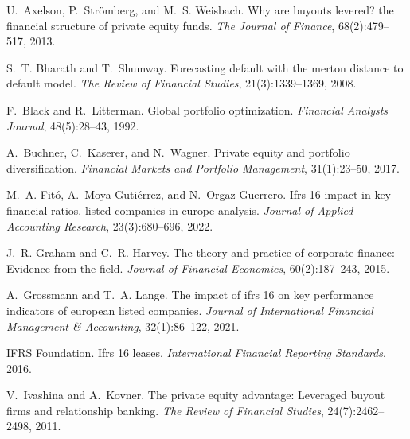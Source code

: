 \documentclass[11pt,a4paper]{article}
\begin{document}

\begin{thebibliography}{10}

U.~Axelson, P.~Strömberg, and M.~S. Weisbach.
\newblock Why are buyouts levered? the financial structure of private equity funds.
\newblock \emph{The Journal of Finance}, 68(2):479--517, 2013.

S.~T. Bharath and T.~Shumway.
\newblock Forecasting default with the merton distance to default model.
\newblock \emph{The Review of Financial Studies}, 21(3):1339--1369, 2008.

F.~Black and R.~Litterman.
\newblock Global portfolio optimization.
\newblock \emph{Financial Analysts Journal}, 48(5):28--43, 1992.

A.~Buchner, C.~Kaserer, and N.~Wagner.
\newblock Private equity and portfolio diversification.
\newblock \emph{Financial Markets and Portfolio Management}, 31(1):23--50, 2017.

M.~A. Fitó, A.~Moya-Gutiérrez, and N.~Orgaz-Guerrero.
\newblock Ifrs 16 impact in key financial ratios. listed companies in europe analysis.
\newblock \emph{Journal of Applied Accounting Research}, 23(3):680--696, 2022.

J.~R. Graham and C.~R. Harvey.
\newblock The theory and practice of corporate finance: Evidence from the field.
\newblock \emph{Journal of Financial Economics}, 60(2):187--243, 2015.

A.~Grossmann and T.~A. Lange.
\newblock The impact of ifrs 16 on key performance indicators of european listed companies.
\newblock \emph{Journal of International Financial Management \& Accounting}, 32(1):86--122, 2021.

IFRS Foundation.
\newblock Ifrs 16 leases.
\newblock \emph{International Financial Reporting Standards}, 2016.

V.~Ivashina and A.~Kovner.
\newblock The private equity advantage: Leveraged buyout firms and relationship banking.
\newblock \emph{The Review of Financial Studies}, 24(7):2462--2498, 2011.


\end{thebibliography}
\end{document}
